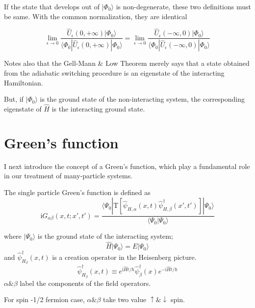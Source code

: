 ﻿\documentclass[twoside]{book}
\numberwithin{equation}{section}
\begin{document}

If the state that develops out of $|\Phi_0\rangle$ is non-degenerate, these two definitions must be same. With the common normalization, they are identical

\[\lim_{\epsilon\to0}\frac{\hat{U}_\epsilon(0,+\infty)|\Phi_0\rangle}{\langle\Phi_0|\hat{U}_\epsilon(0,+\infty)|\Phi_0\rangle}=\lim_{\epsilon\to0}\frac{\hat{U}_\epsilon(-\infty,0)|\Phi_0\rangle}{\langle\Phi_0|\hat{U}_\epsilon(-\infty,0)|\Phi_0\rangle} \]

Notes also that the Gell-Mann \& Low Theorem merely says that a state obtained from the adiabatic switching procedure is an eigenstate of the interacting Hamiltonian. 

But, if $|\Phi_0\rangle$ is the ground state of the non-interacting system, the corresponding eigenstate of $\hat{H}$ is {} the interacting ground state. 




\section{Green's function}

I next introduce the concept of a Green's function, which play a fundamental role in our treatment of many-particle systems.

The single particle Green's function is defined as
\begin{equation}\label{2.3.1}
\mathrm{i}G_{\alpha\beta}(x,t;x',t')=\frac{\langle\Psi_0|\mathrm{T}[\hat \psi
_{H,\alpha}(x,t)\hat \psi^{\dagger}_{H,\beta} (x',t')]|\Psi_0\rangle}{\langle\Psi_0|\Psi_0\rangle}
\end{equation}

where $|\Psi_0\rangle$ is the ground state of the interacting system;
\begin{equation}
\hat{H}|\Psi_0\rangle=E|\Psi_0\rangle \nonumber
\end{equation}
and $\hat \psi^{
\dagger}_{H_{\beta}}(x,t)$ is a creation operator in the Heisenberg picture.
\begin{equation}
\hat \psi^{
\dagger}_{H_{\beta}}(x,t) \equiv e^{\mathrm{i}\hat{H}t/\hbar}\hat \psi^{
\dagger}_{\beta}(x)e^{-\mathrm{i}\hat{H}t/\hbar} \nonumber
\end{equation}
$\alpha \& \beta$ label the components of the field operators.

For spin -1/2 fermion case, $\alpha \& \beta$ take two value $\uparrow \& \downarrow$ spin.
\end{document}
